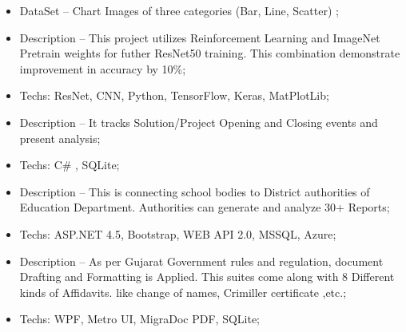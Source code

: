 \documentclass[10pt,a4paper]{altacv}
\begin{document}
\divider

\begin{itemize}
  \item DataSet -- Chart Images of three categories (Bar, Line, Scatter) ;
  \item Description -- This project utilizes Reinforcement Learning and ImageNet Pretrain weights for futher ResNet50 training. This combination demonstrate improvement in accuracy by 10\%;
  \item Techs: ResNet, CNN, Python, TensorFlow, Keras, MatPlotLib;
\end{itemize}

\divider
%



\begin{itemize}
  \item Description -- It tracks Solution/Project Opening and Closing events and present analysis;
  \item Techs: C\# , SQLite;
\end{itemize}

\divider

%
\begin{itemize}
  \item Description -- This is connecting school bodies to District authorities of Education Department. Authorities  can generate and analyze 30+ Reports;
  \item Techs: ASP.NET 4.5, Bootstrap, WEB API 2.0, MSSQL, Azure;
\end{itemize}

\divider

\begin{itemize}
  \item Description -- As per Gujarat Government rules and regulation, document Drafting and Formatting is Applied. This suites come along with 8 Different kinds of Affidavits. like change of names, Crimiller certificate ,etc.;
  \item Techs: WPF, Metro UI, MigraDoc PDF, SQLite;
\end{itemize}
\end{document}
